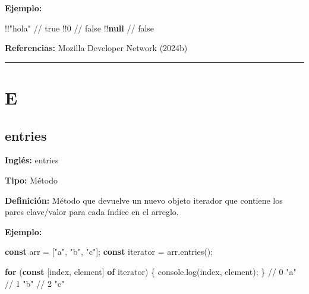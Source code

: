 \documentclass[
  letterpaper,
  DIV=11,
  numbers=noendperiod]{scrreprt}
\newenvironment{Shaded}{\begin{snugshade}}{\end{snugshade}}
\newcommand{\BuiltInTok}[1]{\textcolor[rgb]{0.00,0.23,0.31}{#1}}
\newcommand{\CommentTok}[1]{\textcolor[rgb]{0.37,0.37,0.37}{#1}}
\newcommand{\ControlFlowTok}[1]{\textcolor[rgb]{0.00,0.23,0.31}{\textbf{#1}}}
\newcommand{\DecValTok}[1]{\textcolor[rgb]{0.68,0.00,0.00}{#1}}
\newcommand{\FunctionTok}[1]{\textcolor[rgb]{0.28,0.35,0.67}{#1}}
\newcommand{\KeywordTok}[1]{\textcolor[rgb]{0.00,0.23,0.31}{\textbf{#1}}}
\newcommand{\NormalTok}[1]{\textcolor[rgb]{0.00,0.23,0.31}{#1}}
\newcommand{\OperatorTok}[1]{\textcolor[rgb]{0.37,0.37,0.37}{#1}}
\newcommand{\StringTok}[1]{\textcolor[rgb]{0.13,0.47,0.30}{#1}}
\let\oldsubsection\subsection
\renewcommand{\subsection}{\phantomsection\oldsubsection}
\begin{document}
\textbf{Ejemplo:}

\begin{Shaded}
\begin{Highlighting}[]
\OperatorTok{!!}\StringTok{"hola"}  \CommentTok{// true}
\OperatorTok{!!}\DecValTok{0}       \CommentTok{// false}
\OperatorTok{!!}\KeywordTok{null}    \CommentTok{// false}
\end{Highlighting}
\end{Shaded}

\textbf{Referencias:} Mozilla Developer Network (2024b)

\begin{center}\rule{0.5\linewidth}{0.5pt}\end{center}

\section*{E}\label{e}


\subsection*{entries}\label{glos-entries}

\textbf{Inglés:} entries

\textbf{Tipo:} Método

\textbf{Definición:} Método que devuelve un nuevo objeto iterador que
contiene los pares clave/valor para cada índice en el arreglo.

\textbf{Ejemplo:}

\begin{Shaded}
\begin{Highlighting}[]
\KeywordTok{const}\NormalTok{ arr }\OperatorTok{=}\NormalTok{ [}\StringTok{"a"}\OperatorTok{,} \StringTok{"b"}\OperatorTok{,} \StringTok{"c"}\NormalTok{]}\OperatorTok{;}
\KeywordTok{const}\NormalTok{ iterator }\OperatorTok{=}\NormalTok{ arr}\OperatorTok{.}\FunctionTok{entries}\NormalTok{()}\OperatorTok{;}

\ControlFlowTok{for}\NormalTok{ (}\KeywordTok{const}\NormalTok{ [index}\OperatorTok{,}\NormalTok{ element] }\KeywordTok{of}\NormalTok{ iterator) \{}
  \BuiltInTok{console}\OperatorTok{.}\FunctionTok{log}\NormalTok{(index}\OperatorTok{,}\NormalTok{ element)}\OperatorTok{;}
\NormalTok{\}}
\CommentTok{// 0 "a"}
\CommentTok{// 1 "b"}
\CommentTok{// 2 "c"}
\end{Highlighting}
\end{Shaded}
\end{document}
